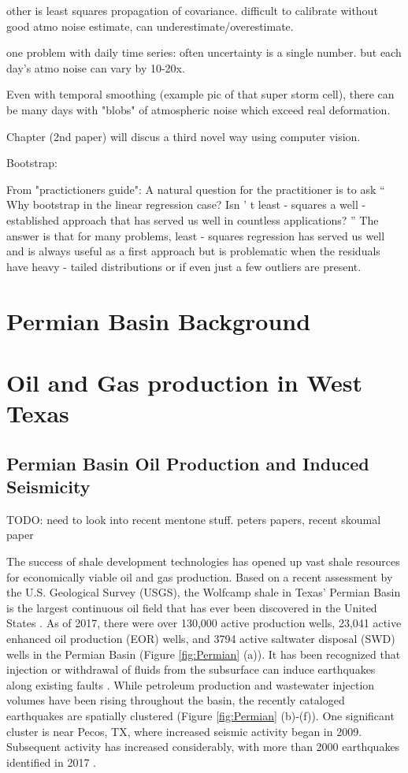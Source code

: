\documentclass{utexasthesis}
\begin{document}
other is least squares propagation of covariance. difficult to calibrate without good atmo noise estimate, can underestimate/overestimate.

one problem with daily time series: often uncertainty is a single number. but each day's atmo noise can vary by 10-20x.

Even with temporal smoothing (example pic of that super storm cell), there can be many days with "blobs" of atmospheric noise which exceed real deformation.

Chapter (2nd paper) will discus a third novel way using computer vision.


Bootstrap:

From "practictioners guide":
A natural question for the practitioner is to ask  “ Why bootstrap in the linear regression case? Isn ’ t least - squares a well - established approach that  has  served  us  well  in  countless  applications? ”   The  answer  is  that  for  many  problems, least - squares regression has served us well and is always useful as  a first approach but is problematic when the residuals have heavy - tailed distributions or if even just a few outliers are present.

\chapter{Permian Basin Background}


\chapter{Oil and Gas production in West Texas}

\section{Permian Basin Oil Production and Induced Seismicity}

TODO: need to look into recent mentone stuff. peters papers, recent skoumal paper

The success of shale development technologies \cite{Waters2006use} has opened up vast shale resources for economically viable oil and gas production. Based on a recent assessment by the U.S. Geological Survey (USGS), the Wolfcamp shale in Texas' Permian Basin is the largest continuous oil field that has ever been discovered in the United States \cite{GaswirthAssessment2016}. As of 2017, there were over 130,000 active production wells, 23,041 active enhanced oil production (EOR) wells, and 3794 active saltwater disposal (SWD) wells in the Permian Basin (Figure \ref{fig:Permian} (a)). It has been recognized that injection or withdrawal of fluids from the subsurface can induce earthquakes along existing faults \cite{Ellsworth2013, simpson1988two}. While petroleum production and wastewater injection volumes have been rising throughout the basin, the recently cataloged earthquakes are spatially clustered (Figure \ref{fig:Permian} (b)-(f)). One significant cluster is near Pecos, TX, where increased seismic activity began in 2009. Subsequent activity has increased considerably, with more than 2000 earthquakes identified in 2017 \cite{Frohlich2019}.
\end{document}
